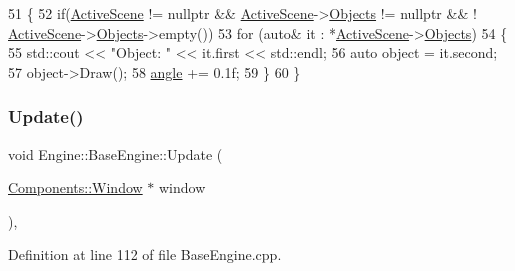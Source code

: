 \begin{DoxyCode}
51 \{
52     \textcolor{keywordflow}{if}(\mbox{\hyperlink{classEngine_1_1BaseEngine_adb3dbc839da9d821e08b18d8a221698d}{ActiveScene}} != \textcolor{keyword}{nullptr} && \mbox{\hyperlink{classEngine_1_1BaseEngine_adb3dbc839da9d821e08b18d8a221698d}{ActiveScene}}->\mbox{\hyperlink{classEngine_1_1Components_1_1Scene_a23481feabaaa56bf5613765db03af4da}{Objects}} != \textcolor{keyword}{nullptr} && !
      \mbox{\hyperlink{classEngine_1_1BaseEngine_adb3dbc839da9d821e08b18d8a221698d}{ActiveScene}}->\mbox{\hyperlink{classEngine_1_1Components_1_1Scene_a23481feabaaa56bf5613765db03af4da}{Objects}}->empty())
53     \textcolor{keywordflow}{for} (\textcolor{keyword}{auto}& it : *\mbox{\hyperlink{classEngine_1_1BaseEngine_adb3dbc839da9d821e08b18d8a221698d}{ActiveScene}}->\mbox{\hyperlink{classEngine_1_1Components_1_1Scene_a23481feabaaa56bf5613765db03af4da}{Objects}})
54     \{
55         std::cout << \textcolor{stringliteral}{"Object: "} << it.first << std::endl;
56         \textcolor{keyword}{auto} \textcolor{keywordtype}{object} = it.second;
57         \textcolor{keywordtype}{object}->Draw();
58         \mbox{\hyperlink{classApplication_1_1Engines_1_1TriangleEngine_a71526be47b8a14b2f9980fa3ff1022b2}{angle}} += 0.1f;
59     \}
60 \}
\end{DoxyCode}
\mbox{\label{classEngine_1_1BaseEngine_a01c23c2073f08939a660f3b7a866852c}} 
\subsubsection{\texorpdfstring{Update()}{Update()}\hspace{0.1cm}{\footnotesize\ttfamily [2/2]}}
{\footnotesize\ttfamily void Engine\+::\+Base\+Engine\+::\+Update (\begin{DoxyParamCaption}\item[{\mbox{\hyperlink{classEngine_1_1Components_1_1Window}{Components\+::\+Window}} $\ast$}]{window }\end{DoxyParamCaption})\hspace{0.3cm}{\ttfamily [virtual]}, {\ttfamily [inherited]}}



Definition at line 112 of file Base\+Engine.\+cpp.


